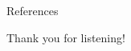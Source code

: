 \documentclass[10pt]{beamer}
\begin{document}
	\begin{frame}{References}
		\printbibliography
	\end{frame}
	\begin{frame}
		\centering \Large{Thank you for listening!}
	\end{frame}
\end{document}
